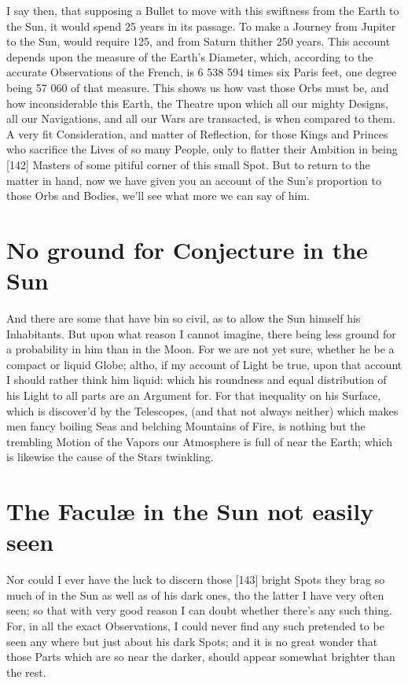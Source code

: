 \documentclass[letterpaper]{book}
\begin{document}
I say then, that supposing a Bullet to move with this swiftness from the
Earth to the Sun, it would spend 25 years in its passage. To make a Journey
from Jupiter to the Sun, would require 125, and from Saturn thither 250
years. This account depends upon the measure of the Earth's Diameter,
which, according to the accurate Observations of the French, is 6 538 594
times six Paris feet, one degree being 57 060 of that measure. This shows
us how vast those Orbs must be, and how inconsiderable this Earth, the
Theatre upon which all our mighty Designs, all our Navigations, and all our
Wars are transacted, is when compared to them. A very fit Consideration,
and matter of Reflection, for those Kings and Princes who sacrifice the Lives
of so many People, only to flatter their Ambition in being [142] Masters of
some pitiful corner of this small Spot. But to return to the matter in hand,
now we have given you an account of the Sun's proportion to those Orbs
and Bodies, we'll see what more we can say of him.


\section{No ground for Conjecture in the Sun}

And there are some that have bin so civil, as to allow the Sun himself his
Inhabitants. But upon what reason I cannot imagine, there being less
ground for a probability in him than in the Moon. For we are not yet sure,
whether he be a compact or liquid Globe; altho, if my account of Light be
true, upon that account I should rather think him liquid: which his
roundness and equal distribution of his Light to all parts are an Argument
for. For that inequality on his Surface, which is discover'd by the
Telescopes, (and that not always neither) which makes men fancy boiling Seas
and belching Mountains of Fire, is nothing but the trembling Motion of the
Vapors our Atmosphere is full of near the Earth; which is likewise the cause
of the Stars twinkling.


\section{The Faculæ in the Sun not easily seen}

Nor could I ever have the luck to discern those [143] bright Spots they brag
so much of in the Sun as well as of his dark ones, tho the latter I have very
often seen; so that with very good reason I can doubt whether there's any
such thing. For, in all the exact Observations, I could never find any such
pretended to be seen any where but just about his dark Spots; and it is no
great wonder that those Parts which are so near the darker, should appear
somewhat brighter than the rest.
\end{document}
